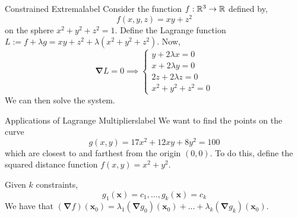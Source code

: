 \begin{ex}{Constrained Extrema}{label}
  Consider the function $f: \mathbb{R}^3 \rightarrow \mathbb{R}$ defined by,
  \[f(x,y,z) = xy + z^2\]
  on the sphere $x^2 + y^2 + z^2 = 1$. Define the Lagrange function $L := f+\lambda g=x y+z^2+\lambda\left(x^2+y^2+z^2\right)$. Now,
  \[
  \mathbf{\nabla} L=0 \implies \left\{\begin{array}{l}
    y+2 \lambda x=0 \\
    x+2 \lambda y=0 \\
    2 z+2 \lambda z=0 \\
    x^2+y^2+z^2=0
    \end{array}\right.
  \]
  We can then solve the system.
\end{ex}

\begin{ex}{Applications of Lagrange Multipliers}{label}
    We want to find the points on the curve
    \[g(x, y) = 17x^2+12xy + 8y^2 = 100\]
    which are closest to and farthest from the origin $(0,0)$. To do this, define the squared distance function $f(x, y) = x^2+y^2$.
\end{ex}

\begin{rmk}
    Given $k$ constraints,
    \[g_1(\mathbf{x})=c_1, \ldots, g_k(\mathbf{x})=c_k\]
    We have that $\left(\mathbf{\nabla} f\right)\left(\mathbf{x}_0\right)=\lambda_1\left(\mathbf{\nabla} g_0\right)\left(\mathbf{x}_0\right)+\ldots+\lambda_k\left(\mathbf{\nabla} g_k \right)\left(\mathbf{x}_0\right)$.
\end{rmk}